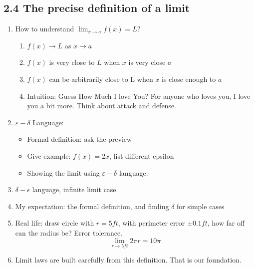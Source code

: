 \documentclass{article}
\begin{document}
\subsection{2.4 The precise definition of a limit}
\begin{enumerate}

\item How to understand $\lim_{x\rightarrow a} f(x) = L$? 
\begin{enumerate}
\item $f(x)\rightarrow L$ as $x \rightarrow a$
\item $f(x)$ is very close to $L$ when $x$ is very close $a$
\item $f(x)$ can be arbitrarily close to L when $x$ is close enough to $a$ 
\item Intuition: Guess How Much I love You? For anyone who loves you, I love you a bit more. Think about attack and defense.

\end{enumerate}

\item $\varepsilon - \delta$ Language:
\begin{itemize}
\item Formal definition: ask the preview
\item Give example: $f(x) = 2x$, list different epsilon
\item Showing the limit using $\varepsilon - \delta$ language.
\end{itemize}
\item $\delta - \epsilon$ language, infinite limit case.
\item My expectation: the formal definition, and finding $\delta$ for simple cases

\item Real life: draw circle with $r = 5 ft$, with perimeter error $\pm 0.1ft$, how far off can the radius be? Error tolerance.
$$
\lim_{r\rightarrow 5ft} 2\pi r = 10 \pi
$$
\item Limit laws are built carefully from this definition. That is our foundation.

\end{enumerate}


\end{document}
